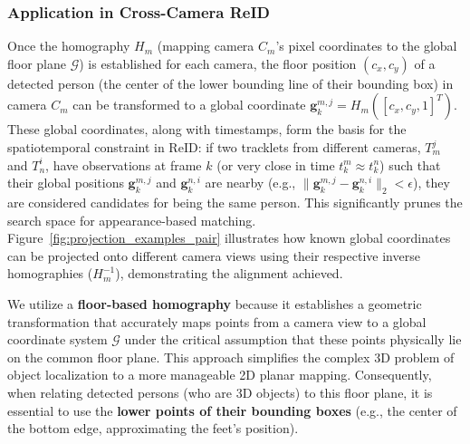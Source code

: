 \documentclass[12pt, a4paper]{article}
\begin{document}
\subsubsection{Application in Cross-Camera ReID}
Once the homography $H_m$ (mapping camera $C_m$'s pixel coordinates to the global floor plane $\mathcal{G}$) is established for each camera, the floor position $(c_x, c_y)$ of a detected person (the center of the lower bounding line of their bounding box) in camera $C_m$ can be transformed to a global coordinate $\mathbf{g}_k^{m,j} = H_m ([c_x, c_y, 1]^T)$. These global coordinates, along with timestamps, form the basis for the spatiotemporal constraint in ReID: if two tracklets from different cameras, $T_m^j$ and $T_n^i$, have observations at frame $k$ (or very close in time $t_k^m \approx t_k^n$) such that their global positions $\mathbf{g}_k^{m,j}$ and $\mathbf{g}_k^{n,i}$ are nearby (e.g., $\|\mathbf{g}_k^{m,j} - \mathbf{g}_k^{n,i} \|_2 < \epsilon$), they are considered candidates for being the same person. This significantly prunes the search space for appearance-based matching. Figure~\ref{fig:projection_examples_pair} illustrates how known global coordinates can be projected onto different camera views using their respective inverse homographies ($H_m^{-1}$), demonstrating the alignment achieved. 


We utilize a \textbf{floor-based homography} because it establishes a geometric transformation that accurately maps points from a camera view to a global coordinate system $\mathcal{G}$ under the critical assumption that these points physically lie on the common floor plane. This approach simplifies the complex 3D problem of object localization to a more manageable 2D planar mapping. Consequently, when relating detected persons (who are 3D objects) to this floor plane, it is essential to use the \textbf{lower points of their bounding boxes} (e.g., the center of the bottom edge, approximating the feet's position). 
\end{document}
